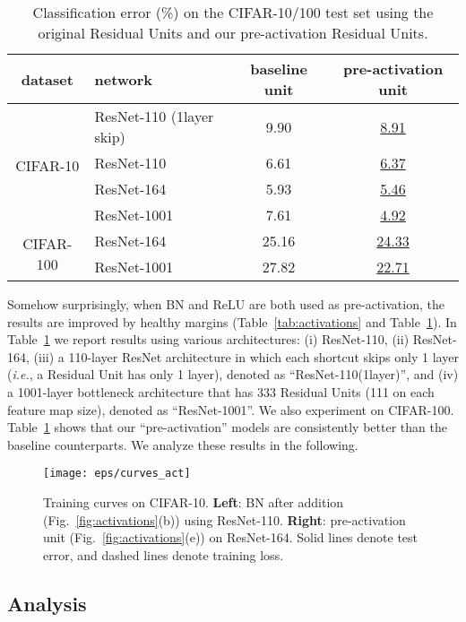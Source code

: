 \documentclass[runningheads]{llncs}
\def\ie{\emph{i.e.}}
\begin{document}
\renewcommand\arraystretch{1.3}
\setlength{\tabcolsep}{4pt}
\begin{table}[t]
\caption{Classification error (\%) on the CIFAR-10/100 test set using the original Residual Units and our pre-activation Residual Units.}\label{tab:preact}
\centering
\fontsize{8pt}{1em}\selectfont
\begin{tabular}{c|l|c|c}
\hline
dataset & network & baseline unit & pre-activation unit \\
\hline
\multirow{4}{*}{CIFAR-10}
& ResNet-110 (1layer skip) & 9.90 & \underline{8.91}\\
& ResNet-110 & 6.61 & \underline{6.37}\\
& ResNet-164 & 5.93 & \underline{5.46}\\
& ResNet-1001 & 7.61 & \underline{4.92}\\
\hline
\multirow{2}{*}{CIFAR-100}
& ResNet-164 & 25.16 & \underline{24.33}\\
& ResNet-1001 & 27.82  & \underline{22.71}\\
\hline
\end{tabular}
\end{table}

Somehow surprisingly, when BN and ReLU are both used as pre-activation, the results are improved by healthy margins (Table~\ref{tab:activations} and Table~\ref{tab:preact}). In Table~\ref{tab:preact} we report results using various architectures: (i) ResNet-110, (ii) ResNet-164, (iii) a 110-layer ResNet architecture in which each shortcut skips only 1 layer (\ie, a Residual Unit has only 1 layer), denoted as ``ResNet-110(1layer)'', and (iv) a 1001-layer bottleneck architecture that has 333 Residual Units (111 on each feature map size), denoted as ``ResNet-1001''. We also experiment on CIFAR-100. Table~\ref{tab:preact} shows that our ``pre-activation'' models are consistently better than the baseline counterparts. We analyze these results in the following.

\begin{figure}[t]
\centering
\texttt{[image: eps/curves\_act]}
\caption{Training curves on CIFAR-10. \textbf{Left}: BN after addition (Fig.~\ref{fig:activations}(b)) using ResNet-110. \textbf{Right}: pre-activation unit (Fig.~\ref{fig:activations}(e)) on ResNet-164. Solid lines denote test error, and dashed lines denote training loss.
}
\label{fig:curves_act}
\end{figure}

\subsection{Analysis}
\end{document}
